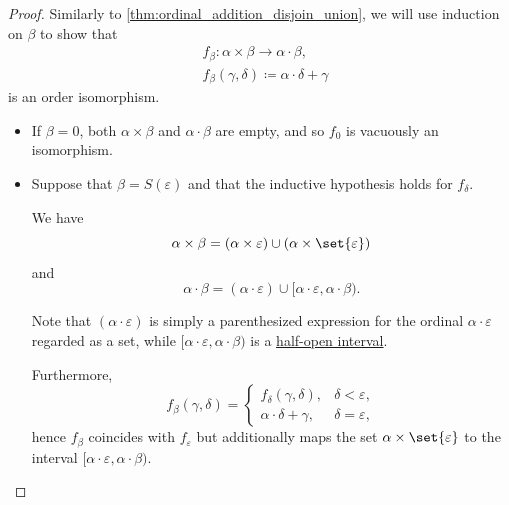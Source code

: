 \begin{proof}
  Similarly to \cref{thm:ordinal_addition_disjoin_union}, we will use induction on \( \beta \) to show that
  \begin{equation*}
    \begin{aligned}
      &f_\beta: \alpha \times \beta \to \alpha \cdot \beta, \\
      &f_\beta(\gamma, \delta) \coloneqq \alpha \cdot \delta + \gamma
    \end{aligned}
  \end{equation*}
  is an order isomorphism.

  \begin{itemize}
    \item If \( \beta = 0 \), both \( \alpha \times \beta \) and \( \alpha \cdot \beta \) are empty, and so \( f_0 \) is vacuously an isomorphism.

    \item Suppose that \( \beta = S(\varepsilon) \) and that the inductive hypothesis holds for \( f_\delta \).

    We have
    \begin{equation*}
      \alpha \times \beta = (\alpha \times \varepsilon) \cup (\alpha \times \set{ \varepsilon })
    \end{equation*}
    and
    \begin{equation*}
      \alpha \cdot \beta = (\alpha \cdot \varepsilon) \cup [\alpha \cdot \varepsilon, \alpha \cdot \beta).
    \end{equation*}

    Note that \( (\alpha \cdot \varepsilon) \) is simply a parenthesized expression for the ordinal \( \alpha \cdot \varepsilon \) regarded as a set, while \( [\alpha \cdot \varepsilon, \alpha \cdot \beta) \) is a \hyperref[def:order_interval/half_open]{half-open interval}.

    Furthermore,
    \begin{equation*}
      f_\beta(\gamma, \delta) = \begin{cases}
        f_\delta(\gamma, \delta),     &\delta < \varepsilon, \\
        \alpha \cdot \delta + \gamma, &\delta = \varepsilon,
      \end{cases}
    \end{equation*}
    hence \( f_\beta \) coincides with \( f_\varepsilon \) but additionally maps the set \( \alpha \times \set{ \varepsilon } \) to the interval \( [\alpha \cdot \varepsilon, \alpha \cdot \beta) \).


\end{itemize}
\end{proof}
